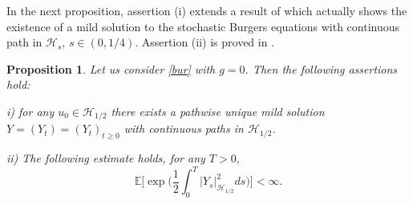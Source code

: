 \documentclass[preprint]{imsart}
\newtheorem{proposition}[theorem]{Proposition}
\def\E{\mathbb E}
\begin{document}
  
\vskip 1mm      
In the next proposition, assertion (i) extends  a result   of \cite{ergodicity} which actually shows the existence of a mild solution to the stochastic Burgers equations with continuous path in ${\mathcal H}_s$, $s \in (0,1/4)$.        
 Assertion (ii) is proved in \cite{burgers}.
 \begin{proposition} \label{dap}
 Let us consider \eqref{bur} with $g=0$.  Then the following assertions hold:
 
 i) for any $u_0 \in {\mathcal H}_{1/2}$ there exists a pathwise unique mild solution $Y = (Y_t) = (Y_t)_{t \ge 0 }$ with continuous paths in ${\mathcal H}_{1/2}$. 
 
 ii)  The following estimate holds, for any $T>0,$
 \begin{equation}\label{esp}
 \E \Big [ \exp \Big ( {\frac{1}{2} \int_0^T \big |Y_s \big |_{{\mathcal H}_{1/2}}^2 ds} \Big )\Big]  < \infty .
\end{equation}
 \end{proposition}
\end{document}
